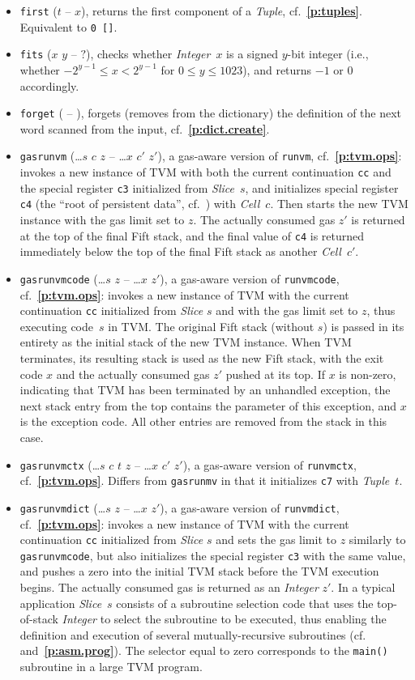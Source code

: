 \documentclass[12pt,oneside]{article}
\def\refpoint#1{{\rm\textbf{\ref{#1}}}}
\let\ptref=\refpoint
\begin{document}
\begin{itemize}
\item {\tt first} ($t$ -- $x$), returns the first component of a {\em Tuple}, cf.~\ptref{p:tuples}. Equivalent to {\tt 0 []}.
\item {\tt fits} ($x$ $y$ -- $?$), checks whether {\em Integer\/}~$x$ is a signed $y$-bit integer (i.e., whether $-2^{y-1}\leq x<2^{y-1}$ for $0\leq y\leq 1023$), and returns $-1$ or $0$ accordingly.
\item {\tt forget} ( -- ), forgets (removes from the dictionary) the definition of the next word scanned from the input, cf.~\ptref{p:dict.create}.
\item {\tt gasrunvm} (\dots $s$ $c$ $z$ -- \dots $x$ $c'$ $z'$), a gas-aware version of {\tt runvm}, cf.~\ptref{p:tvm.ops}: invokes a new instance of TVM with both the current continuation {\tt cc} and the special register {\tt c3} initialized from {\em Slice\/}~$s$, and initializes special register {\tt c4} (the ``root of persistent data'', cf.~\cite[1.4]{TVM}) with {\em Cell\/}~$c$. Then starts the new TVM instance with the gas limit set to $z$. The actually consumed gas $z'$ is returned at the top of the final Fift stack, and the final value of {\tt c4} is returned immediately below the top of the final Fift stack as another {\em Cell\/}~$c'$.
\item {\tt gasrunvmcode} (\dots $s$ $z$ -- \dots $x$ $z'$), a gas-aware version of {\tt runvmcode}, cf.~\ptref{p:tvm.ops}: invokes a new instance of TVM with the current continuation {\tt cc} initialized from {\em Slice\/} $s$ and with the gas limit set to $z$, thus executing code~$s$ in TVM. The original Fift stack (without $s$) is passed in its entirety as the initial stack of the new TVM instance. When TVM terminates, its resulting stack is used as the new Fift stack, with the exit code $x$ and the actually consumed gas $z'$ pushed at its top. If $x$ is non-zero, indicating that TVM has been terminated by an unhandled exception, the next stack entry from the top contains the parameter of this exception, and $x$ is the exception code. All other entries are removed from the stack in this case.
\item {\tt gasrunvmctx} (\dots $s$ $c$ $t$ $z$ -- \dots $x$ $c'$ $z'$), a gas-aware version of {\tt runvmctx}, cf.~\ptref{p:tvm.ops}. Differs from {\tt gasrunmv} in that it initializes {\tt c7} with {\em Tuple\/}~$t$.
\item {\tt gasrunvmdict} (\dots $s$ $z$ -- \dots $x$ $z'$), a gas-aware version of {\tt runvmdict}, cf.~\ptref{p:tvm.ops}: invokes a new instance of TVM with the current continuation {\tt cc} initialized from {\em Slice\/} $s$ and sets the gas limit to $z$ similarly to {\tt gasrunvmcode}, but also initializes the special register {\tt c3} with the same value, and pushes a zero into the initial TVM stack before the TVM execution begins. The actually consumed gas is returned as an {\em Integer\/} $z'$. In a typical application {\em Slice\/}~$s$ consists of a subroutine selection code that uses the top-of-stack {\em Integer\/} to select the subroutine to be executed, thus enabling the definition and execution of several mutually-recursive subroutines (cf.~\cite[4.6]{TVM} and~\ptref{p:asm.prog}). The selector equal to zero corresponds to the {\tt main()} subroutine in a large TVM program.

\end{itemize}
\end{document}
